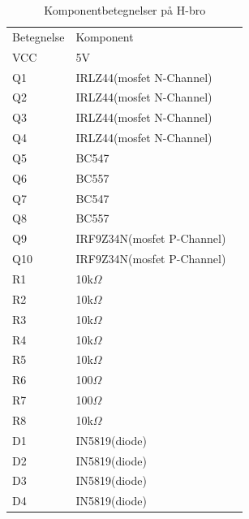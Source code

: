 \begin{table}[H]
	\centering
	\begin{tabular}{|l|l|l}
		\cline{1-2}
		Betegnelse 	& Komponent 	          	 &  \\ \cline{1-2}
		VCC        	& 5V                         &  \\ \cline{1-2}
		Q1   		& IRLZ44(mosfet N-Channel)   &  \\ \cline{1-2}
		Q2   		& IRLZ44(mosfet N-Channel)   &  \\ \cline{1-2}
		Q3   		& IRLZ44(mosfet N-Channel)   &  \\ \cline{1-2}
		Q4   		& IRLZ44(mosfet N-Channel)   &  \\ \cline{1-2}
		Q5   		& BC547                      &  \\ \cline{1-2}
		Q6   		& BC557                      &  \\ \cline{1-2}
		Q7   		& BC547                      &  \\ \cline{1-2}
		Q8   		& BC557                      &  \\ \cline{1-2}
		Q9   		& IRF9Z34N(mosfet P-Channel) &  \\ \cline{1-2}
		Q10  		& IRF9Z34N(mosfet P-Channel) &  \\ \cline{1-2}
		R1   		& 10k$\Omega$                &  \\ \cline{1-2}
		R2   		& 10k$\Omega$                &  \\ \cline{1-2}
		R3   		& 10k$\Omega$                &  \\ \cline{1-2}
		R4   		& 10k$\Omega$                &  \\ \cline{1-2}
		R5   		& 10k$\Omega$                &  \\ \cline{1-2}
		R6   		& 100$\Omega$                &  \\ \cline{1-2}
		R7   		& 100$\Omega$                &  \\ \cline{1-2}
		R8   		& 10k$\Omega$                &  \\ \cline{1-2}
		D1   		& IN5819(diode)              &  \\ \cline{1-2}
		D2   		& IN5819(diode)              &  \\ \cline{1-2}
		D3   		& IN5819(diode)              &  \\ \cline{1-2}
		D4   		& IN5819(diode)              &  \\ \cline{1-2}
	\end{tabular}
	\caption{Komponentbetegnelser på H-bro}
	\label{my-label}
\end{table}

